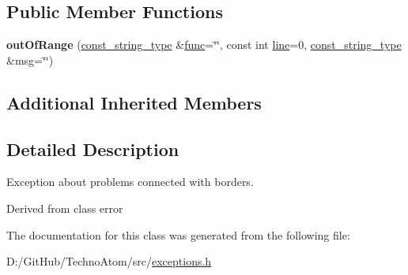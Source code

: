 \subsection*{Public Member Functions}
\begin{DoxyCompactItemize}
\item 
\mbox{\label{classatom_1_1out_of_range_a388ec1d8924de5cfdc8b3bf06554fb3d}} 
{\bfseries out\+Of\+Range} (\hyperlink{classatom_1_1error_ac330e9fb7cedcf4a173c5eb156d7bdaf}{const\+\_\+string\+\_\+type} \&\hyperlink{classatom_1_1error_a0a70a92b1638bfe4be7972651ae0c5c8}{func}=\char`\"{}\char`\"{}, const int \hyperlink{classatom_1_1error_aa9443d1a458d0dc6086372444a58e8c6}{line}=0, \hyperlink{classatom_1_1error_ac330e9fb7cedcf4a173c5eb156d7bdaf}{const\+\_\+string\+\_\+type} \&msg=\char`\"{}\char`\"{})
\end{DoxyCompactItemize}
\subsection*{Additional Inherited Members}


\subsection{Detailed Description}
Exception about problems connected with borders. 

Derived from class error 

The documentation for this class was generated from the following file\+:\begin{DoxyCompactItemize}
\item 
D\+:/\+Git\+Hub/\+Techno\+Atom/src/\hyperlink{exceptions_8h}{exceptions.\+h}\end{DoxyCompactItemize}
